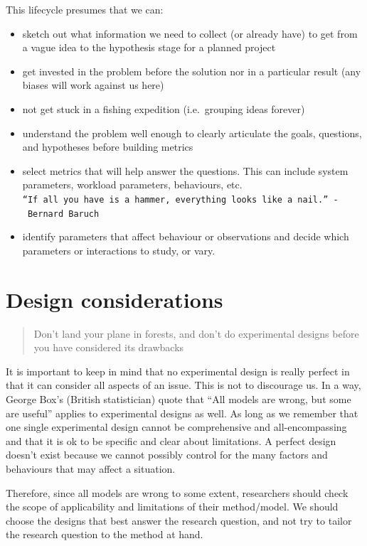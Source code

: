 \documentclass[openany]{book}
\providecommand{\tightlist}{%
  \setlength{\itemsep}{0pt}\setlength{\parskip}{0pt}}
\begin{document}
This lifecycle presumes that we can:

\begin{itemize}
\tightlist
\item
  sketch out what information we need to collect (or already have) to get from a vague idea to the hypothesis stage for a planned project
\item
  get invested in the problem before the solution nor in a particular result (any biases will work against us here)
\item
  not get stuck in a fishing expedition (i.e.~grouping ideas forever)
\item
  understand the problem well enough to clearly articulate the goals, questions, and hypotheses before building metrics
\item
  select metrics that will help answer the questions. This can include system parameters, workload parameters, behaviours, etc. \texttt{“If\ all\ you\ have\ is\ a\ hammer,\ everything\ looks\ like\ a\ nail.”\ -\ Bernard\ Baruch}
\item
  identify parameters that affect behaviour or observations and decide which parameters or interactions to study, or vary.
\end{itemize}

\hypertarget{design-considerations}{%
\section{Design considerations}\label{design-considerations}}

\begin{quote}
Don't land your plane in forests, and don't do experimental designs before you have considered its drawbacks
\end{quote}

It is important to keep in mind that no experimental design is really perfect in that it can consider all aspects of an issue. This is not to discourage us. In a way, George Box's (British statistician) quote that ``All models are wrong, but some are useful'' applies to experimental designs as well.
As long as we remember that one single experimental design cannot be comprehensive and all-encompassing and that it is ok to be specific and clear about limitations. A perfect design doesn't exist because we cannot possibly control for the many factors and behaviours that may affect a situation.

Therefore, since all models are wrong to some extent, researchers should check the scope of applicability and limitations of their method/model. We should choose the designs that best answer the research question, and not try to tailor the research question to the method at hand.
\end{document}

